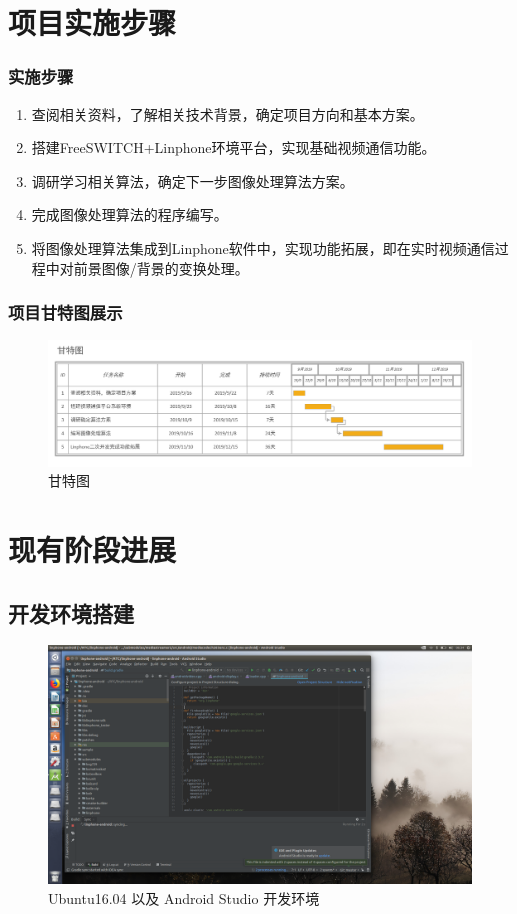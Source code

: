 \documentclass[xcolor=dvipsnames]{beamer}
\begin{document}
\section{项目实施步骤}
\begin{frame}
  \frametitle{实施步骤}
  \begin{enumerate}
    \item 查阅相关资料，了解相关技术背景，确定项目方向和基本方案。
    \item 搭建FreeSWITCH+Linphone环境平台，实现基础视频通信功能。
    \item 调研学习相关算法，确定下一步图像处理算法方案。
    \item 完成图像处理算法的程序编写。
    \item 将图像处理算法集成到Linphone软件中，实现功能拓展，即在实时视频通信过程中对前景图像/背景的变换处理。
  \end{enumerate}
\end{frame}
\begin{frame}
  \frametitle{项目甘特图展示}
  \begin{figure}[]
    \centering
    \includegraphics[scale=0.50]{images/gante.jpg}
    \caption{甘特图}
    \label{}
  \end{figure}
\end{frame}

\section{现有阶段进展}
\subsection{开发环境搭建}
\begin{frame}
  \begin{figure}
    \centering
    \includegraphics[scale=0.15]{images/environment.jpg}
    \caption{Ubuntu16.04 以及 Android Studio 开发环境}
    \label{}
  \end{figure}
\end{frame}
\end{document}
